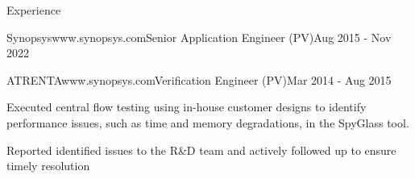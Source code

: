 \documentclass[
11pt, %
]{./assets/resume} %
\begin{document}
\begin{rSection}{Experience}
\begin{rSubsectionX}{Synopsys}{www.synopsys.com}{Senior Application Engineer (PV)}{Aug 2015 - Nov 2022}
	\end{rSubsectionX}
	\begin{rSubsectionX}{ATRENTA}{www.synopsys.com}{Verification Engineer (PV)}{Mar 2014 - Aug 2015}
		\item Executed central flow testing using in-house customer designs to identify performance issues, such as time and memory degradations, in the SpyGlass tool.
		\item Reported identified issues to the R\&D team and actively followed up to ensure timely resolution
	\end{rSubsectionX}
	
\end{rSection}


	

	


\end{document}
